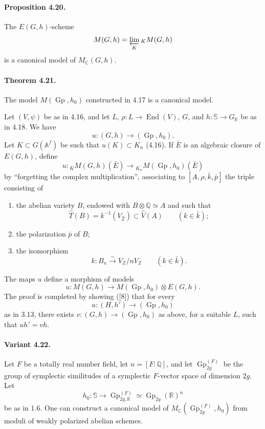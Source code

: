 \documentclass[10pt]{article}
\newcommand{\Af}{\mathbb A^f}
\newcommand{\C}{\mathbb C}
\newcommand{\Q}{\mathbb Q}
\newcommand{\R}{\mathbb R}
\newcommand{\Z}{\mathbb Z}
\newcommand{\bS}{\mathbb S}
\newcommand{\Gp}{\operatorname{Gp}}
\newcommand{\End}{\operatorname{End}}
\begin{document}
\paragraph{Proposition 4.20.} The $E(G,h)$-scheme
\[
M(G,h)=\varprojlim_K {}_K M(G,h)
\]
is a canonical model of $M_{\C}(G,h)$.

\paragraph{Theorem 4.21.} The model $M(\Gp,h_0)$ constructed in 4.17 is a canonical model.

Let $(V,\psi)$ be as in 4.16, and let $L$, $\rho:L\to\End(V)$, $G$, and $h:\bS\to G_\R$ be as in 4.18. We have
\[
u:(G,h)\longrightarrow(\Gp,h_0).
\]
Let $K\subset G(\Af)$ be such that $u(K)\subset K_n$ (4.16). If $\bar E$ is an algebraic closure of $E(G,h)$, define
\[
u:{}_K M(G,h)(\bar E)\longrightarrow{}_{K_n}M(\Gp,h_0)(\bar E)
\]
by ``forgetting the complex multiplication'', associating to $[A,\rho,\bar k,\bar p]$ the triple consisting of
\begin{enumerate}[label=(\alph*)]
\item the abelian variety $B$, endowed with $B\otimes\Q\simeq A$ and such that
\[
\widehat T(B)=k^{-1}(V_{\widehat{\Z}})\subset\widehat V(A)\qquad(k\in\bar k);
\]
\item the polarization $\bar p$ of $B$;
\item the isomorphism
\[
k:B_n\xrightarrow{\sim}V_\Z/nV_\Z\qquad(k\in\bar k).
\]
\end{enumerate}
The maps $u$ define a morphism of models
\[
u:M(G,h)\longrightarrow M(\Gp,h_0)\otimes E(G,h).
\]
The proof is completed by showing ([8]) that for every
\[
u:(H,h')\longrightarrow(\Gp,h_0)
\]
as in 3.13, there exists $v:(G,h)\longrightarrow(\Gp,h_0)$ as above, for a suitable $L$, such that $uh'=vh$.

\paragraph{Variant 4.22.} Let $F$ be a totally real number field, let $n=[F:\Q]$, and let $\Gp_{2g}^{(F)}$ be the group of symplectic similitudes of a symplectic $F$-vector space of dimension $2g$. Let
\[
h_0:\bS\longrightarrow \Gp_{2g,\R}^{(F)}\simeq \Gp_{2g}(\R)^n
\]
be as in 1.6. One can construct a canonical model of $M_{\C}(\Gp_{2g}^{(F)},h_0)$ from moduli of weakly polarized abelian schemes.
\end{document}
